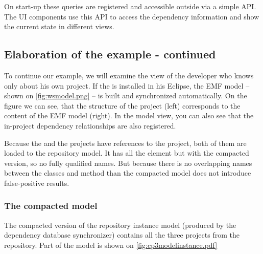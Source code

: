 
On start-up these queries are registered and accessible outside via a simple API.
The UI components use this API to access the dependency information and show the
current state in different views.


\subsection{Elaboration of the example - continued}\label{sect:elabex2}
To continue our example, we will examine the view of the developer who knows
only about his own  project. If the \ptool{} is  installed in his
Eclipse, the EMF model -- shown on \autoref{fig:wsmodel.png}
-- is built and synchronized automatically. On the figure we can see, that the
structure of the project (left) corresponds to the content of the EMF model
(right). In the model view, you can also see that the in-project dependency
relationships are also registered.

Because the  and the  projects have references to the
 project, both of them are loaded to the repository model. It has all the
element but with the compacted version, so no fully qualified names. But because
there is no overlapping names between the classes and method than the compacted
model does not introduce false-positive results.


\subsubsection{The compacted model}
The compacted version of the repository instance model (produced by the
dependency database synchronizer) contains all the three projects from the
repository. Part of the model is shown on
\autoref{fig:cp3modelinstance.pdf} 


